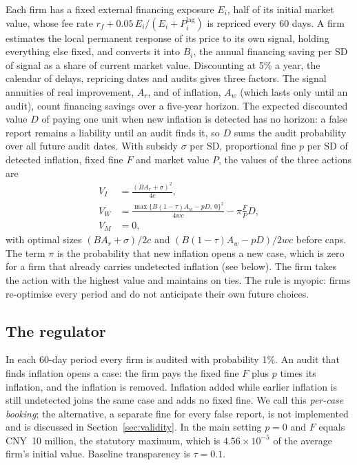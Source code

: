 \documentclass[11pt]{article}
\begin{document}
Each firm has a fixed external financing exposure $E_i$, half of its initial market value, whose fee rate $r_f + 0.05\, E_i/(E_i + P_i^{\text{lag}})$ is repriced every 60 days. A firm estimates the local permanent response of its price to its own signal, holding everything else fixed, and converts it into $B_i$, the annual financing saving per SD of signal as a share of current market value. Discounting at 5\% a year, the calendar of delays, repricing dates and audits gives three factors. The signal annuities of real improvement, $A_r$, and of inflation, $A_w$ (which lasts only until an audit), count financing savings over a five-year horizon. The expected discounted value $D$ of paying one unit when new inflation is detected has no horizon: a false report remains a liability until an audit finds it, so $D$ sums the audit probability over all future audit dates. With subsidy $\sigma$ per SD, proportional fine $p$ per SD of detected inflation, fixed fine $F$ and market value $P$, the values of the three actions are
\begin{align}
V_I &= \frac{(B A_r + \sigma)^2}{4c}, \label{eq:vi}\\
V_W &= \frac{\max\{B(1-\tau)A_w - pD,\, 0\}^2}{4wc} - \pi \frac{F}{P} D, \label{eq:vw}\\
V_M &= 0, \nonumber
\end{align}
with optimal sizes $(BA_r+\sigma)/2c$ and $(B(1-\tau)A_w - pD)/2wc$ before caps. The term $\pi$ is the probability that new inflation opens a new case, which is zero for a firm that already carries undetected inflation (see below). The firm takes the action with the highest value and maintains on ties. The rule is myopic: firms re-optimise every period and do not anticipate their own future choices.

\subsection{The regulator}

In each 60-day period every firm is audited with probability 1\%. An audit that finds inflation opens a case: the firm pays the fixed fine $F$ plus $p$ times its inflation, and the inflation is removed. Inflation added while earlier inflation is still undetected joins the same case and adds no fixed fine. We call this \emph{per-case booking}; the alternative, a separate fine for every false report, is not implemented and is discussed in Section~\ref{sec:validity}. In the main setting $p = 0$ and $F$ equals CNY~10 million, the statutory maximum, which is $4.56\times10^{-5}$ of the average firm's initial value. Baseline transparency is $\tau = 0.1$.
\end{document}
